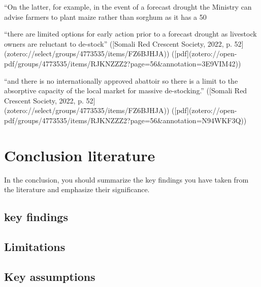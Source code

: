 {{“On the latter, for example, in the event of a forecast drought the Ministry can advise farmers to plant maize rather than sorghum as it has a 50%

“there are limited options for early action prior to a forecast drought as livestock owners are reluctant to de-stock” ([Somali Red Crescent Society, 2022, p. 52](zotero://select/groups/4773535/items/FZ6BJHJA)) ([pdf](zotero://open-pdf/groups/4773535/items/RJKNZZZ2?page=56&annotation=3E9VIM42))

“and there is no internationally approved abattoir so there is a limit to the absorptive capacity of the local market for massive de-stocking.” ([Somali Red Crescent Society, 2022, p. 52](zotero://select/groups/4773535/items/FZ6BJHJA)) ([pdf](zotero://open-pdf/groups/4773535/items/RJKNZZZ2?page=56&annotation=N94WKF3Q))


\section{Conclusion literature}
In the conclusion, you should summarize the key findings you have taken from the literature and emphasize their significance.

\subsection{key findings}


\subsection{Limitations}



\subsection{Key assumptions}





}}
